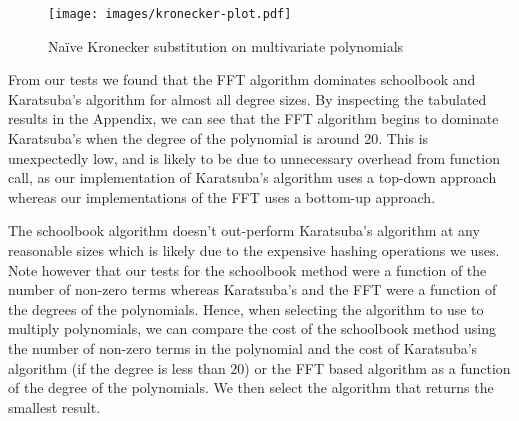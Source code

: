 \begin{figure}[h!]
    \centering
    \texttt{[image: images/kronecker-plot.pdf]}
    \caption{Na\"{i}ve Kronecker substitution on multivariate polynomials}
    \label{fig:kronecker}
\end{figure}

\medskip

From our tests we found that the FFT algorithm dominates schoolbook and Karatsuba's algorithm for almost all degree sizes. By inspecting the tabulated results in the Appendix, we can see that the FFT algorithm begins to dominate Karatsuba's when the degree of the polynomial is around 20. This is unexpectedly low, and is likely to be due to unnecessary overhead from function call, as our implementation of Karatsuba's algorithm uses a top-down approach whereas our implementations of the FFT uses a bottom-up approach.

The schoolbook algorithm doesn't out-perform Karatsuba's algorithm at any reasonable sizes which is likely due to the expensive hashing operations we uses. Note however that our tests for the schoolbook method were a function of the number of non-zero terms whereas Karatsuba's and the FFT were a function of the degrees of the polynomials. Hence, when selecting the algorithm to use to multiply polynomials, we can compare the cost of the schoolbook method using the number of non-zero terms in the polynomial and the cost of Karatsuba's algorithm (if the degree is less than $20$) or the FFT based algorithm as a function of the degree of the polynomials. We then select the algorithm that returns the smallest result.







